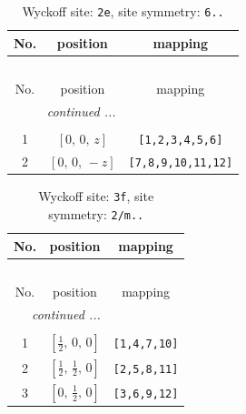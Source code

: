 \documentclass[fleqn,8pt]{jsarticle}
\begin{document}
\begin{longtable}{ccc}
\caption{Wyckoff site: {\tt 2e}, site symmetry: {\tt 6..}}
 \\
 \hline \hline
No. & position & mapping \\ \hline \endfirsthead

\multicolumn{2}{l}{\tablename\ \thetable{}} \\
 \hline \hline
No. & position & mapping \\ \hline \endhead

 \hline \hline
\multicolumn{2}{r}{\footnotesize\it continued ...} \\ \endfoot

 \hline \hline
\multicolumn{2}{r}{} \\ \endlastfoot

1 & $\left[ 0,\, 0,\, z \right]$ & {\tt [1,2,3,4,5,6]} \\ \hline
2 & $\left[ 0,\, 0,\, - z \right]$ & {\tt [7,8,9,10,11,12]} \\
\end{longtable}
\renewcommand{\arraystretch}{1.2}
\begin{longtable}{ccc}
\caption{Wyckoff site: {\tt 3f}, site symmetry: {\tt 2/m..}}
 \\
 \hline \hline
No. & position & mapping \\ \hline \endfirsthead

\multicolumn{2}{l}{\tablename\ \thetable{}} \\
 \hline \hline
No. & position & mapping \\ \hline \endhead

 \hline \hline
\multicolumn{2}{r}{\footnotesize\it continued ...} \\ \endfoot

 \hline \hline
\multicolumn{2}{r}{} \\ \endlastfoot

1 & $\left[ \frac{1}{2},\, 0,\, 0 \right]$ & {\tt [1,4,7,10]} \\ \hline
2 & $\left[ \frac{1}{2},\, \frac{1}{2},\, 0 \right]$ & {\tt [2,5,8,11]} \\ \hline
3 & $\left[ 0,\, \frac{1}{2},\, 0 \right]$ & {\tt [3,6,9,12]} \\
\end{longtable}
\renewcommand{\arraystretch}{1.2}
\end{document}

